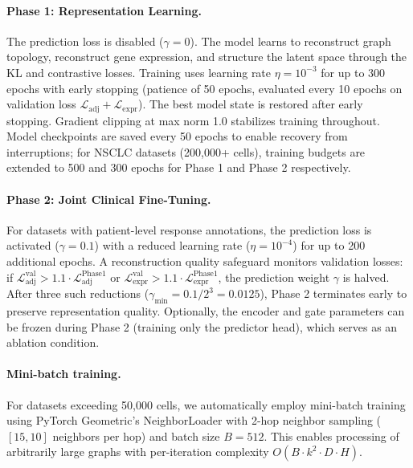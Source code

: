 \documentclass{article}
\begin{document}
\paragraph{Phase 1: Representation Learning.} The prediction loss is disabled ($\gamma = 0$). The model learns to reconstruct graph topology, reconstruct gene expression, and structure the latent space through the KL and contrastive losses. Training uses learning rate $\eta = 10^{-3}$ for up to 300 epochs with early stopping (patience of 50 epochs, evaluated every 10 epochs on validation loss $\mathcal{L}_{\text{adj}} + \mathcal{L}_{\text{expr}}$). The best model state is restored after early stopping. Gradient clipping at max norm 1.0 stabilizes training throughout. Model checkpoints are saved every 50 epochs to enable recovery from interruptions; for NSCLC datasets (200,000+ cells), training budgets are extended to 500 and 300 epochs for Phase 1 and Phase 2 respectively.

\paragraph{Phase 2: Joint Clinical Fine-Tuning.} For datasets with patient-level response annotations, the prediction loss is activated ($\gamma = 0.1$) with a reduced learning rate ($\eta = 10^{-4}$) for up to 200 additional epochs. A reconstruction quality safeguard monitors validation losses: if $\mathcal{L}_{\text{adj}}^{\text{val}} > 1.1 \cdot \mathcal{L}_{\text{adj}}^{\text{Phase1}}$ or $\mathcal{L}_{\text{expr}}^{\text{val}} > 1.1 \cdot \mathcal{L}_{\text{expr}}^{\text{Phase1}}$, the prediction weight $\gamma$ is halved. After three such reductions ($\gamma_{\min} = 0.1/2^3 = 0.0125$), Phase 2 terminates early to preserve representation quality. Optionally, the encoder and gate parameters can be frozen during Phase 2 (training only the predictor head), which serves as an ablation condition.

\paragraph{Mini-batch training.} For datasets exceeding 50,000 cells, we automatically employ mini-batch training using PyTorch Geometric's NeighborLoader with 2-hop neighbor sampling ($[15, 10]$ neighbors per hop) and batch size $B = 512$. This enables processing of arbitrarily large graphs with per-iteration complexity $O(B \cdot k^2 \cdot D \cdot H)$.
\end{document}
